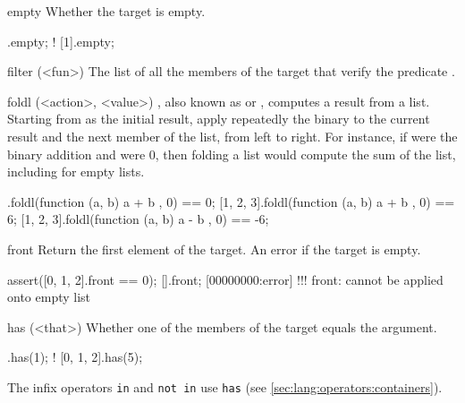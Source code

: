 \begin{urbiscriptapi}
\item[empty]
  Whether the target is empty.

\begin{urbiassert}
   [].empty;
! [1].empty;
\end{urbiassert}

\item[filter](<fun>)%
  The list of all the members of the target that verify the predicate
  .


\item[foldl](<action>, <value>)%
  ,
  also known as  or , computes a result
  from a list.  Starting from  as the initial result, apply
  repeatedly the binary  to the current result and the
  next member of the list, from left to right.  For instance, if
   were the binary addition and  were 0, then
  folding a list would compute the sum of the list, including for
  empty lists.

\begin{urbiassert}
       [].foldl(function (a, b) { a + b }, 0) == 0;
[1, 2, 3].foldl(function (a, b) { a + b }, 0) == 6;
[1, 2, 3].foldl(function (a, b) { a - b }, 0) == -6;
\end{urbiassert}

\item[front]
  Return the first element of the target. An error if the target is
  empty.
\begin{urbiscript}
assert([0, 1, 2].front == 0);
[].front;
[00000000:error] !!! front: cannot be applied onto empty list
\end{urbiscript}

\item[has](<that>)%
  Whether one of the members of the target equals the argument.

\begin{urbiassert}
[0, 1, 2].has(1);
! [0, 1, 2].has(5);
\end{urbiassert}

  The infix operators \lstinline|in| and \lstinline|not in| use
  \lstinline|has| (see \autoref{sec:lang:operators:containers}).


\end{urbiscriptapi}
